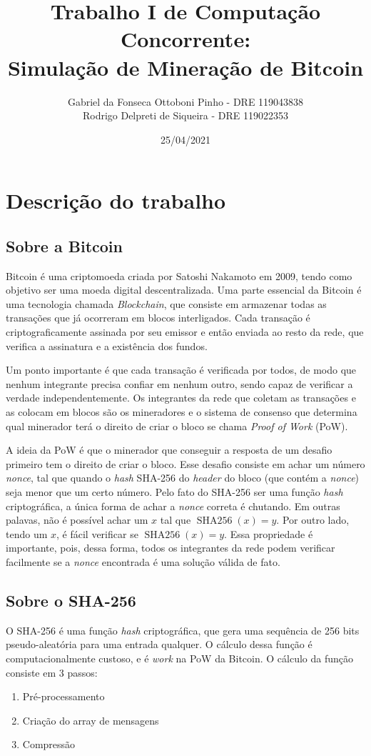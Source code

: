 \documentclass[12pt]{article}
\author{Gabriel da Fonseca Ottoboni Pinho - DRE 119043838\\
Rodrigo Delpreti de Siqueira - DRE 119022353}
\title{Trabalho I de Computação Concorrente: \\Simulação de Mineração de Bitcoin}
\date{25/04/2021}
\DeclareMathOperator{\sha}{SHA256}
\begin{document}
\maketitle
\newpage

\section{Descrição do trabalho}
\subsection{Sobre a Bitcoin}
Bitcoin é uma criptomoeda criada por Satoshi Nakamoto em 2009,
tendo como objetivo ser uma moeda digital descentralizada.
Uma parte essencial da Bitcoin é uma tecnologia chamada \textit{Blockchain},
que consiste em armazenar todas as transações que já ocorreram
em blocos interligados.
Cada transação é criptograficamente assinada por seu emissor
e então enviada ao resto da rede,
que verifica a assinatura e a existência dos fundos.

Um ponto importante é que cada transação é verificada por todos,
de modo que nenhum integrante precisa confiar em nenhum outro,
sendo capaz de verificar a verdade independentemente.
Os integrantes da rede que coletam as transações
e as colocam em blocos são os mineradores
e o sistema de consenso que determina qual minerador
terá o direito de criar o bloco se chama \textit{Proof of Work} (PoW).

A ideia da PoW é que o minerador que conseguir
a resposta de um desafio primeiro
tem o direito de criar o bloco.
Esse desafio consiste em achar um número \textit{nonce},
tal que quando o \textit{hash} SHA-256 do \textit{header} do bloco
(que contém a \textit{nonce})
seja menor que um certo número.
Pelo fato do SHA-256 ser uma função \textit{hash} criptográfica,
a única forma de achar a \textit{nonce} correta é chutando.
Em outras palavas, não é possível achar um
$x$ tal que $\sha(x) = y$.
Por outro lado, tendo um $x$, é fácil verificar se $\sha(x) = y$.
Essa propriedade é importante,
pois, dessa forma, todos os integrantes da rede podem
verificar facilmente se a \textit{nonce} encontrada
é uma solução válida de fato.

\subsection{Sobre o SHA-256}
O SHA-256 é uma função \textit{hash} criptográfica,
que gera uma sequência de 256 bits pseudo-aleatória
para uma entrada qualquer.
O cálculo dessa função é computacionalmente custoso,
e é \textit{work} na PoW da Bitcoin.
O cálculo da função consiste em 3 passos:
\begin{enumerate}
	\item Pré-processamento
	\item Criação do array de mensagens
	\item Compressão
\end{enumerate}
\end{document}
